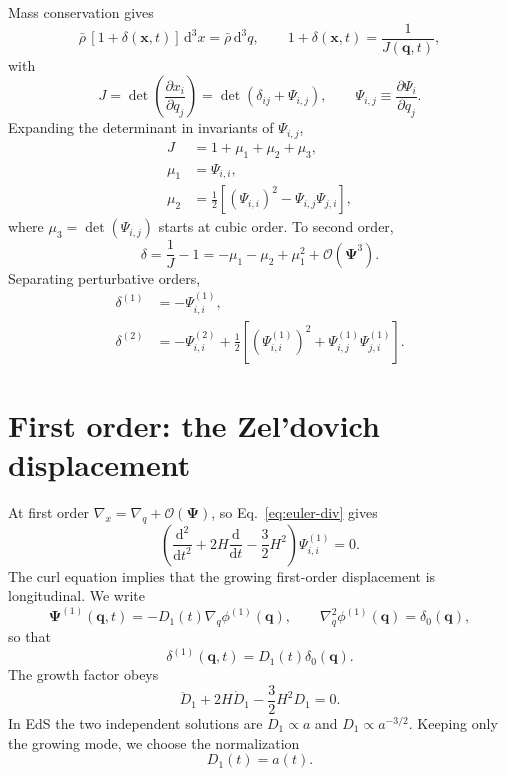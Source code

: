 \documentclass[11pt]{article}
\newcommand{\dd}{\mathrm{d}}
\newcommand{\gradq}{\nabla_{\!q}}
\newcommand{\gradx}{\nabla_{\!x}}
\newcommand{\lapq}{\nabla_{\!q}^{2}}
\newcommand{\PsiL}{\bm{\Psi}}
\newcommand{\xv}{\bm{x}}
\newcommand{\qv}{\bm{q}}
\begin{document}
Mass conservation gives
\begin{equation}
  \bar\rho\,[1+\delta(\xv,t)]\,\dd^3x
  = \bar\rho\,\dd^3q,
  \qquad
  1+\delta(\xv,t)=\frac{1}{J(\qv,t)},
\end{equation}
with
\begin{equation}
  J = \det\!\left(\frac{\partial x_i}{\partial q_j}\right)
    = \det\!\left(\delta_{ij}+\Psi_{i,j}\right),
  \qquad
  \Psi_{i,j}\equiv \frac{\partial \Psi_i}{\partial q_j}.
\end{equation}
Expanding the determinant in invariants of $\Psi_{i,j}$,
\begin{align}
  J &= 1+\mu_1+\mu_2+\mu_3,\\
  \mu_1 &= \Psi_{i,i},\\
  \mu_2 &= \frac{1}{2}\left[
      \left(\Psi_{i,i}\right)^2-\Psi_{i,j}\Psi_{j,i}
    \right],
\end{align}
where $\mu_3=\det(\Psi_{i,j})$ starts at cubic order.  To second order,
\begin{equation}
  \delta = \frac{1}{J}-1
  = -\mu_1-\mu_2+\mu_1^2+\mathcal{O}(\PsiL^3).
\end{equation}
Separating perturbative orders,
\begin{align}
  \delta^{(1)}
    &= -\Psi^{(1)}_{i,i}, \label{eq:delta-first}\\
  \delta^{(2)}
    &= -\Psi^{(2)}_{i,i}
       +\frac{1}{2}\left[
          \left(\Psi^{(1)}_{i,i}\right)^2
          +\Psi^{(1)}_{i,j}\Psi^{(1)}_{j,i}
        \right].
       \label{eq:delta-second}
\end{align}

\section{First order: the Zel'dovich displacement}

At first order $\gradx=\gradq+\mathcal{O}(\PsiL)$, so
Eq.~\eqref{eq:euler-div} gives
\begin{equation}
  \left(\frac{\dd^2}{\dd t^2}
       +2H\frac{\dd}{\dd t}
       -\frac{3}{2}H^2
  \right)
  \Psi^{(1)}_{i,i}=0.
  \label{eq:first-div-eq}
\end{equation}
The curl equation implies that the growing first-order displacement is
longitudinal.  We write
\begin{equation}
  \PsiL^{(1)}(\qv,t)=-D_1(t)\gradq\phi^{(1)}(\qv),
  \qquad
  \lapq\phi^{(1)}(\qv)=\delta_0(\qv),
  \label{eq:first-displacement}
\end{equation}
so that
\begin{equation}
  \delta^{(1)}(\qv,t)=D_1(t)\delta_0(\qv).
\end{equation}
The growth factor obeys
\begin{equation}
  \ddot D_1+2H\dot D_1-\frac{3}{2}H^2D_1=0.
  \label{eq:d1-eq}
\end{equation}
In EdS the two independent solutions are $D_1\propto a$ and
$D_1\propto a^{-3/2}$.  Keeping only the growing mode, we choose the
normalization
\begin{equation}
  D_1(t)=a(t).
\end{equation}
\end{document}
